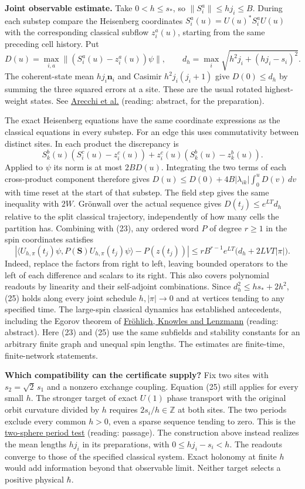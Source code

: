 \documentclass[11pt,a4paper]{article}
\begin{document}
\textbf{Joint observable estimate.} Take \(0<h\le s_*\), so
\(\|S_i^a\|\le hj_i\le B\). During each substep compare the Heisenberg
coordinates \(S_i^a(u)=U(u)^*S_i^a U(u)\) with the corresponding
classical subflow \(z_i^a(u)\), starting from the same preceding cell
history. Put \[
 D(u)=\max_{i,a}\|(S_i^a(u)-z_i^a(u))\psi\|,\qquad
 d_h=\max_i\sqrt{h^2j_i+(hj_i-s_i)^2}.
\] The coherent-state mean \(hj_i\mathbf n_i\) and Casimir
\(h^2j_i(j_i+1)\) give \(D(0)\le d_h\) by summing the three squared
errors at a site. These are the usual rotated highest-weight states. See
\href{https://doi.org/10.1103/PhysRevA.6.2211}{Arecchi et al.} (reading:
abstract, for the preparation).

The exact Heisenberg equations have the same coordinate expressions as
the classical equations in every substep. For an edge this uses
commutativity between distinct sites. In each product the discrepancy is
\[
 S_k^b(u)(S_i^c(u)-z_i^c(u))
       +z_i^c(u)(S_k^b(u)-z_k^b(u)).
\] Applied to \(\psi\) its norm is at most \(2B D(u)\). Integrating the
two terms of each cross-product component therefore gives
\(D(u)\le D(0)+4B|\lambda_{ik}|\int_0^u D(v)\,dv\) with time reset at
the start of that substep. The field step gives the same inequality with
\(2W\). Grönwall over the actual sequence gives \(D(t_j)\le e^{LT}d_h\)
relative to the split classical trajectory, independently of how many
cells the partition has. Combining with (23), any ordered word \(P\) of
degree \(r\ge1\) in the spin coordinates satisfies \[
 \left|\langle U_{h,\pi}(t_j)\psi,P(\mathbf S)U_{h,\pi}(t_j)\psi\rangle
               -P(z(t_j))\right|
 \le rB^{r-1} e^{LT}\bigl(d_h+2LVT|\pi|\bigr). \tag{25}
\] Indeed, replace the factors from right to left, leaving bounded
operators to the left of each difference and scalars to its right. This
also covers polynomial readouts by linearity and their self-adjoint
combinations. Since \(d_h^2\le h s_*+2h^2\), (25) holds along every
joint schedule \(h,|\pi|\to0\) and at vertices tending to any specified
time. The large-spin classical dynamics has established antecedents,
including the Egorov theorem of
\href{https://arxiv.org/abs/0709.4561}{Fröhlich, Knowles and Lenzmann}
(reading: abstract). Here (23) and (25) use the same subfields and
stability constants for an arbitrary finite graph and unequal spin
lengths. The estimates are finite-time, finite-network statements.

\textbf{Which compatibility can the certificate supply?} Fix two sites
with \(s_2=\sqrt 2\,s_1\) and a nonzero exchange coupling. Equation (25)
still applies for every small \(h\). The stronger target of exact
\(U(1)\) phase transport with the original orbit curvature divided by
\(h\) requires \(2s_i/h\in\mathbb Z\) at both sites. The two periods
exclude every common \(h>0\), even a sparse sequence tending to zero.
This is the
\href{rotation-composition-universality.md\#common-scaling-local-caps-and-coupled-spheres}{two-sphere
period test} (reading: passage). The construction above instead realizes
the mean lengths \(hj_i\) in its preparations, with \(0\le hj_i-s_i<h\).
The readouts converge to those of the specified classical system. Exact
holonomy at finite \(h\) would add information beyond that observable
limit. Neither target selects a positive physical \(\hbar\).
\end{document}
